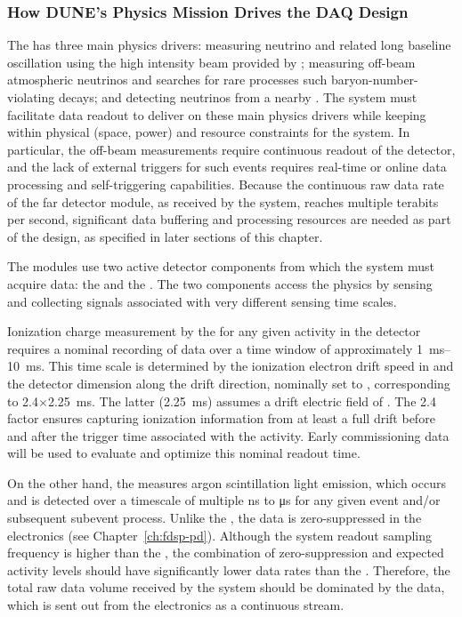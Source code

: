 \subsubsection{How DUNE's Physics Mission Drives the DAQ Design}

The   has three main physics drivers: measuring neutrino  and related
long baseline oscillation using the high intensity beam provided
by \fnal; measuring off-beam atmospheric neutrinos and searches
for rare processes such baryon-number-violating decays;
and detecting neutrinos from a nearby . The
   system must facilitate data
readout to deliver on these main physics drivers while keeping
within physical (space, power) and resource constraints for
the system. In particular, the off-beam measurements require continuous readout of the detector, and the lack of external triggers for such
events requires real-time or online data processing and
self-triggering capabilities. Because the
continuous raw data rate of the far detector module, as received by
the  system, reaches multiple
terabits per second, significant data buffering and processing
resources are needed as part of the design, as specified in
later sections of this chapter.

The   modules use two active detector components from which the  system must acquire data: the  and the . The two components access the physics by sensing and collecting signals associated with very different sensing time scales.

Ionization charge measurement by the  for any given activity in the detector requires a nominal recording of data over a time window of approximately \SIrange{1}{10}{\milli\second}. 
This time scale is determined by the ionization electron drift speed in  and the detector dimension along the drift direction, nominally set to \spreadout, corresponding to 2.4$\times$\SI{2.25}{\milli\second}.
The latter (\SI{2.25}{\milli\second}) assumes a drift electric field of \mindriftfieldgoal.
The 2.4 factor ensures capturing ionization information from at
least a full drift before and after the trigger time associated with the
activity. Early commissioning data will be used to evaluate and optimize this nominal readout time.

On the other hand, the  measures argon scintillation light emission, which
occurs and is detected over a timescale of multiple \si{\nano\second} to
\si{\micro\second} for
any given event and/or subsequent subevent process. Unlike the ,
the  data is zero-suppressed in
the  electronics (see Chapter~\ref{ch:fdsp-pd}). Although
the  system readout sampling frequency is higher than the , the combination of zero-suppression and expected activity
levels should have significantly lower data rates than the . Therefore, the total raw data volume received by
the  system should be dominated by
the  data, which is sent out from the  electronics as a continuous stream.
 
